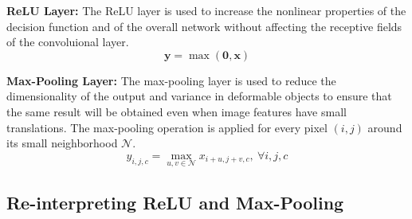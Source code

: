 \textbf{ReLU Layer:}
The ReLU layer is used to increase the nonlinear properties of the decision function and of the overall network without affecting the receptive fields of the convoluional layer.
\begin{equation}
\mathbf{y} = \max (\mathbf{0}, \mathbf{x})
\label{eq:relu}
\end{equation}

\textbf{Max-Pooling Layer:}
The max-pooling layer is used to reduce the dimensionality of the output and variance in deformable objects to ensure that the same result will be obtained even when image features have small translations. The max-pooling operation is applied for every pixel $(i,j)$ around its small neighborhood $\mathcal{N}$.
\begin{equation}
y_{i,j,c} = \max_{u,v \in \mathcal{N}} x_{i+u, j+v, c},\ \forall i, j, c
\label{eq:max-pool}
\end{equation}

\subsection{Re-interpreting ReLU and Max-Pooling}


